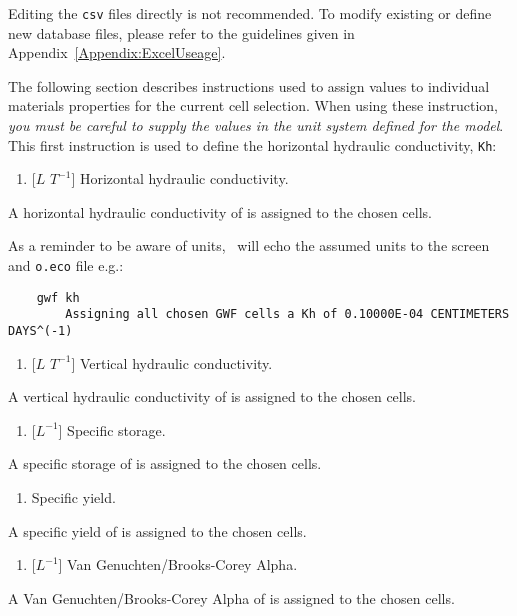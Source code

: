 {Editing the \texttt{csv} files directly is not recommended. To modify existing or define new database files, please refer to the guidelines given in Appendix~\ref{Appendix:ExcelUseage}.

The following section describes instructions used to assign values to individual materials properties for the current cell selection.  When using these instruction, {\em you must be careful to supply the values in the unit system defined for the model}. This first instruction is used to define the horizontal hydraulic conductivity, \texttt{Kh}:

    {
        \squish
        \begin{enumerate}
        \item {} [$L$   $T^{-1}$]  Horizontal hydraulic conductivity.
        \end{enumerate}
          A horizontal hydraulic conductivity of  is assigned to the chosen cells.
    }

As a reminder to be aware of units, \mut\ will echo the assumed units to the screen and \texttt{o.eco} file e.g.:
\begin{verbatim}
    gwf kh
    	Assigning all chosen GWF cells a Kh of 0.10000E-04 CENTIMETERS DAYS^(-1)
\end{verbatim}

    {
        \squish
        \begin{enumerate}
        \item {} [$L$   $T^{-1}$]  Vertical hydraulic conductivity.
        \end{enumerate}
          A vertical hydraulic conductivity of  is assigned to the chosen cells.
    }

    {
        \squish
        \begin{enumerate}
        \item {} [$L^{-1}$]  Specific storage.
        \end{enumerate}
          A specific storage of  is assigned to the chosen cells.
    }

    {
        \squish
        \begin{enumerate}
        \item {}  Specific yield.
        \end{enumerate}
          A specific yield of   is assigned to the chosen cells.
    }

    {
        \squish
        \begin{enumerate}
        \item {} [$L^{-1}$]  Van Genuchten/Brooks-Corey Alpha.
        \end{enumerate}
          A Van Genuchten/Brooks-Corey Alpha of  is assigned to the chosen cells.
    }

}
